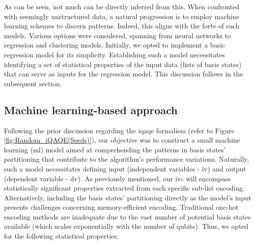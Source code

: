 As can be seen, not much can be directly inferred from this. When confronted with seemingly unstructured data, a natural progression is to employ machine learning schemes to discern patterns. Indeed, this aligns with the forte of such models. Various options were considered, spanning from neural networks to regression and clustering models. Initially, we opted to implement a basic regression model for its simplicity. Establishing such a model necessitates identifying a set of statistical properties of the input data (lists of basis states) that can serve as inputs for the regression model. This discussion follows in the subsequent section.

\vspace{-2.5mm}
\subsection*{Machine learning-based approach}
Following the prior discussion regarding the \acrshort{iqaqe} formalism (refer to Figure \ref{fig:Random_iQAQE(Seeds)}), our objective was to construct a small machine learning (\acrshort{ml}) model aimed at comprehending the patterns in basis states' partitioning that contribute to the algorithm's performance variations. Naturally, such a model necessitates defining input (independent variables - \acrshort{iv}) and output (dependent variable - \acrshort{dv}). As previously mentioned, our \acrshort{iv}\textcolor{gray}{s} will encompass statistically significant properties extracted from each specific sub-list encoding. Alternatively, including the basis states' partitioning directly as the model's input presents challenges concerning memory-efficient encoding. Traditional one-hot encoding methods are inadequate due to the vast number of potential basis states available (which scales exponentially with the number of qubits). Thus, we opted for the following statistical properties:
